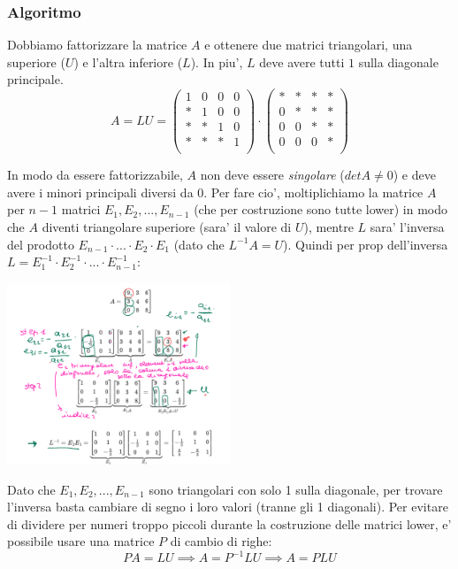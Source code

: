 \documentclass{report}
\begin{document}
\subsubsection{Algoritmo}
Dobbiamo fattorizzare la matrice $ A $ e ottenere due matrici triangolari, una superiore ($ U $) e l'altra inferiore ($ L $). In piu', $ L $ deve avere tutti $ 1 $ sulla diagonale principale. 
\[
A = LU = \begin{pmatrix}
1 & 0 & 0 & 0\\
* & 1 & 0 & 0\\
* & * & 1 & 0\\
* & * & * & 1\\
\end{pmatrix} \cdot \begin{pmatrix}
* & * & * & *\\
0 & * & * & *\\
0 & 0 & * & *\\
0 & 0 & 0 & *\\
\end{pmatrix}
\]

In modo da essere fattorizzabile, $ A $ non deve essere \textit{singolare} ($ detA \neq 0 $) e deve avere i minori principali diversi da 0. Per fare cio', moltiplichiamo la matrice $ A $ per $ n-1 $ matrici $ E_1, E_2, ..., E_{n-1} $ (che per costruzione sono tutte lower) in modo che $ A $ diventi triangolare superiore (sara' il valore di $ U $), mentre $ L $ sara' l'inversa del prodotto $ E_{n-1}\cdot ... \cdot E_2 \cdot E_1 $ (dato che $ L^{-1}A = U $). Quindi per prop dell'inversa $ L = E_1^{-1} \cdot E_2^{-1} \cdot ... \cdot E_{n-1}^{-1} $:
\begin{center}
  \includegraphics[width=0.5\textwidth]{img/2024-10-04-12-23-45.png}
\end{center}
Dato che $ E_1, E_2, ..., E_{n-1} $ sono triangolari con solo 1 sulla diagonale, per trovare l'inversa basta cambiare di segno i loro valori (tranne gli 1 diagonali). Per evitare di dividere per numeri troppo piccoli durante la costruzione delle matrici lower, e' possibile usare una matrice $ P $ di cambio di righe:
\[
PA = LU \implies A = P^{-1}LU \implies A = PLU
\]
\end{document}
